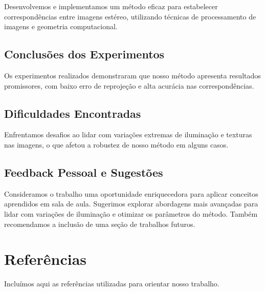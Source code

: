 \documentclass{article}
\begin{document}
Desenvolvemos e implementamos um método eficaz para estabelecer correspondências entre imagens estéreo, utilizando técnicas de processamento de imagens e geometria computacional.

\subsection{Conclusões dos Experimentos}

Os experimentos realizados demonstraram que nosso método apresenta resultados promissores, com baixo erro de reprojeção e alta acurácia nas correspondências.

\subsection{Dificuldades Encontradas}

Enfrentamos desafios ao lidar com variações extremas de iluminação e texturas nas imagens, o que afetou a robustez de nosso método em alguns casos.

\subsection{Feedback Pessoal e Sugestões}

Consideramos o trabalho uma oportunidade enriquecedora para aplicar conceitos aprendidos em sala de aula. Sugerimos explorar abordagens mais avançadas para lidar com variações de iluminação e otimizar os parâmetros do método. Também recomendamos a inclusão de uma seção de trabalhos futuros.

\section{Referências}

Incluímos aqui as referências utilizadas para orientar nosso trabalho.
\end{document}
